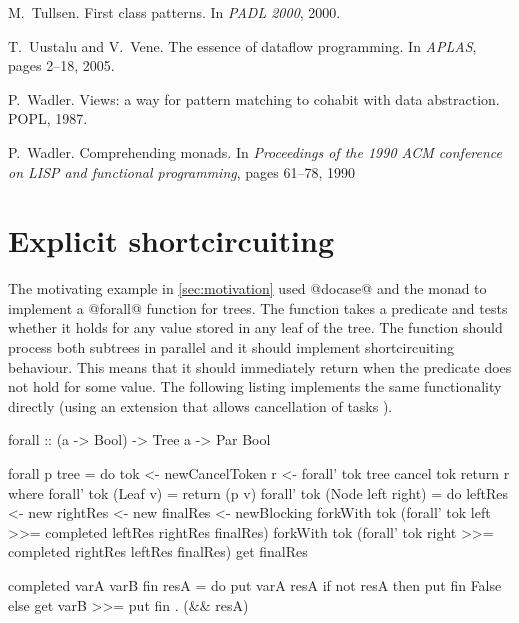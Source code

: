 \documentclass[preprint]{sigplanconf}
\begin{document}
\begin{thebibliography}{37}
M.~Tullsen.
\newblock First class patterns.
\newblock In \emph{PADL 2000}, 2000.

T.~Uustalu and V.~Vene.
\newblock The essence of dataflow programming.
\newblock In \emph{APLAS}, pages 2--18, 2005.

P.~Wadler.
\newblock Views: a way for pattern matching to cohabit with data abstraction.
\newblock POPL, 1987.

P.~Wadler.
\newblock Comprehending monads.
\newblock In \emph{Proceedings of the 1990 ACM conference on LISP and
  functional programming}, pages 61--78, 1990

\end{thebibliography}


\appendix

\section{Explicit shortcircuiting}
\label{sec:appendix-shortcircuit}
The motivating example in \ref{sec:motivation} used @docase@ and the  monad to implement
a @forall@ function for trees. The function takes a predicate and tests whether it holds for any
value stored in any leaf of the tree. The function should process both subtrees in parallel and
it should implement shortcircuiting behaviour. This means that it should immediately return when
the predicate does not hold for some value. The following listing implements the same functionality
directly (using an extension that allows cancellation of tasks \cite{parmonad-cancellation}).

\begin{code}
forall :: (a -> Bool) -> Tree a -> Par Bool

forall p tree = do
    tok <- newCancelToken
    r <- forall' tok tree
    cancel tok 
    return r
  where 
    forall' tok (Leaf v) = return (p v)
    forall' tok (Node left right) = do
      leftRes <- new
      rightRes <- new
      finalRes <- newBlocking
      forkWith tok (forall' tok left >>= 
        completed leftRes rightRes finalRes)
      forkWith tok (forall' tok right >>= 
        completed rightRes leftRes finalRes)
      get finalRes
    
    completed varA varB fin resA = do
      put varA resA
      if not resA then put fin False
      else get varB >>= put fin . (&& resA)
\end{code}
\end{document}
